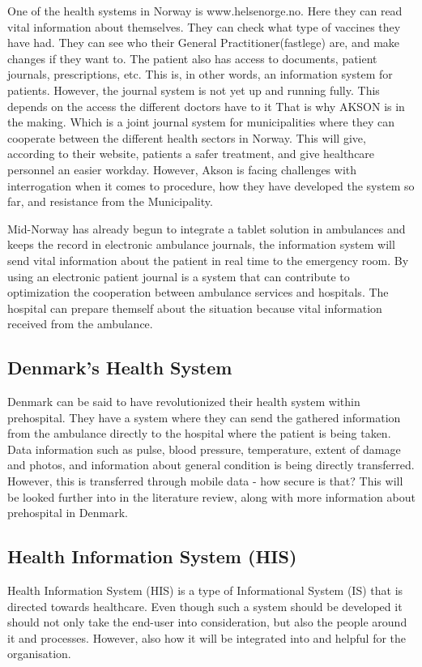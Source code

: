 \documentclass[fleqn,10pt]{wlscirep}
\begin{document}
One of the health systems in Norway is www.helsenorge.no. Here they can read vital information about themselves. They can check what type of vaccines they have had. They can see who their General Practitioner(fastlege) are, and make changes if they want to. The patient also has access to documents, patient journals, prescriptions, etc. This is, in other words, an information system for patients\cite{M_Kilde5}. 
However, the journal system is not yet up and running fully. This depends on the access the different doctors have to it\cite{M_Kilde6} That is why AKSON is in the making. Which is a joint journal system for municipalities where they can cooperate between the different health sectors in Norway. This will give, according to their website, patients a safer treatment, and give healthcare personnel an easier workday\cite{M_Kilde3}. However, Akson is facing challenges with interrogation when it comes to procedure, how they have developed the system so far, and resistance from the Municipality\cite{M_Kilde6}. 

Mid-Norway has already begun to integrate a tablet solution in ambulances and keeps the record in electronic ambulance journals, the information system will send vital information about the patient in real time to the emergency room. By using an electronic patient journal is a system that can contribute to optimization the cooperation between ambulance services and hospitals. The hospital can prepare themself about the situation because vital information received from the ambulance\cite{M_Kilde7}.

\subsection{Denmark's Health System}
Denmark can be said to have revolutionized their health system within prehospital. They have a system where they can send the gathered information from the ambulance directly to the hospital where the patient is being taken. Data information such as pulse, blood pressure, temperature, extent of damage and photos, and information about general condition is being directly transferred\cite{M_Kilde4}. 
	However, this is transferred through mobile data - how secure is that? This will be looked further into in the literature review, along with more information about prehospital in Denmark. 


\subsection{Health Information System (HIS)}
Health Information System (HIS) is a type of Informational System (IS) that is directed towards healthcare. Even though such a system should be developed it should not only take the end-user into consideration, but also the people around it and processes. However, also how it will be integrated into and helpful for the organisation\cite{M_Kilde15}. 
\end{document}
